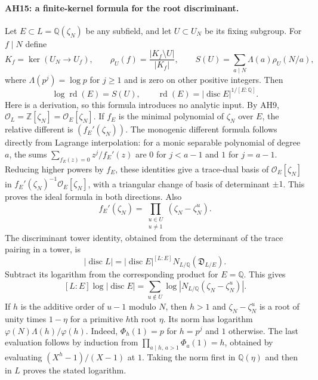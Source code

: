 \paragraph{AH15: a finite-kernel formula for the root discriminant.}
Let $E\subset L=\mathbb Q(\zeta_N)$ be any subfield, and let
$U\subset U_N$ be its fixing subgroup. For $f\mid N$ define
\[
 K_f=\ker(U_N\longrightarrow U_f),\qquad
 \rho_U(f)=\frac{|K_f\setminus U|}{|K_f|},\qquad
 S(U)=\sum_{a\mid N}\Lambda(a)\rho_U(N/a),        \tag{AH.36}
\]
where $\Lambda(p^j)=\log p$ for $j\ge1$ and is zero on other positive
integers. Then
\[
           \log\operatorname{rd}(E)=S(U),\qquad
 \operatorname{rd}(E)=|\operatorname{disc}E|^{1/[E:\mathbb Q]}.
                                                               \tag{AH.37}
\]
Here is a derivation, so this formula introduces no analytic input.
By AH9, $\mathcal O_L=\mathbb Z[\zeta_N]=\mathcal O_E[\zeta_N]$.
If $f_E$ is the minimal polynomial of $\zeta_N$ over $E$, the relative
different is $(f_E'(\zeta_N))$. The monogenic different formula follows
directly from Lagrange interpolation: for a monic separable polynomial
of degree $a$, the sums
$\sum_{f_E(z)=0}z^j/f_E'(z)$ are $0$ for $j<a-1$ and $1$ for $j=a-1$.
Reducing higher powers by $f_E$, these identities give a trace-dual basis
of $\mathcal O_E[\zeta_N]$ in
$f_E'(\zeta_N)^{-1}\mathcal O_E[\zeta_N]$, with a triangular change of
basis of determinant $\pm1$. This proves the ideal formula in both
directions. Also
\[
 f_E'(\zeta_N)=
       \prod_{\substack{u\in U\\u\ne1}}(\zeta_N-\zeta_N^u).
\]
The discriminant tower identity, obtained from the determinant of the
trace pairing in a tower, is
\[
 |\operatorname{disc}L|
   =|\operatorname{disc}E|^{[L:E]}
      N_{L/\mathbb Q}(\mathfrak D_{L/E}).
\]
Subtract its logarithm from the corresponding product for $E=\mathbb Q$.
This gives
\[
 [L:E]\log|\operatorname{disc}E|
       =\sum_{u\notin U}\log|N_{L/\mathbb Q}(\zeta_N-\zeta_N^u)|.
                                                               \tag{AH.38}
\]
If $h$ is the additive order of $u-1$ modulo $N$, then $h>1$ and
$\zeta_N-\zeta_N^u$ is a root of unity times $1-\eta$ for a primitive
$h$th root $\eta$. Its norm has logarithm
$\varphi(N)\Lambda(h)/\varphi(h)$. Indeed,
$\Phi_h(1)=p$ for $h=p^j$ and $1$ otherwise. The last evaluation follows
by induction from
$\prod_{a\mid h,\,a>1}\Phi_a(1)=h$, obtained by evaluating
$(X^h-1)/(X-1)$ at $1$. Taking the norm first in $\mathbb Q(\eta)$ and
then in $L$ proves the stated logarithm.

